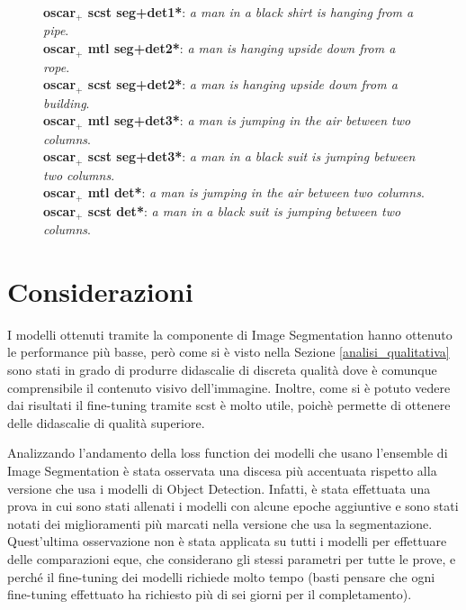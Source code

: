 \begin{figure}[H]
{        \textbf{\acrshort{oscar}$_+$ \acrshort{scst} seg+det1*}: \textit{a man in a black shirt is hanging from a pipe}.\\
        \textbf{\acrshort{oscar}$_+$ \acrshort{mtl} seg+det2*}: \textit{a man is hanging upside down from a rope}.\\
        \textbf{\acrshort{oscar}$_+$ \acrshort{scst} seg+det2*}: \textit{a man is hanging upside down from a building}.\\
        \textbf{\acrshort{oscar}$_+$ \acrshort{mtl} seg+det3*}: \textit{a man is jumping in the air between two columns}.\\
        \textbf{\acrshort{oscar}$_+$ \acrshort{scst} seg+det3*}: \textit{a man in a black suit is jumping between two columns}.\\
        \textbf{\acrshort{oscar}$_+$ \acrshort{mtl} det*}: \textit{a man is jumping in the air between two columns}.\\
        \textbf{\acrshort{oscar}$_+$ \acrshort{scst} det*}: \textit{a man in a black suit is jumping between two columns}.
        }
        \label{fig:test6}
\end{figure}
\newpage

\section{Considerazioni}\label{considerazioni}
I modelli ottenuti tramite la componente di Image Segmentation hanno ottenuto le performance più basse, però come si è visto nella Sezione \ref{analisi_qualitativa} sono stati in grado di produrre didascalie di discreta qualità dove è comunque comprensibile il contenuto visivo dell'immagine. Inoltre, come si è potuto vedere dai risultati il fine-tuning tramite \acrshort{scst} è molto utile, poichè permette di ottenere delle didascalie di qualità superiore. 


Analizzando l'andamento della loss function dei modelli che usano l'ensemble di Image Segmentation è stata osservata una discesa più accentuata rispetto alla versione che usa i modelli di Object Detection. Infatti, è stata effettuata una prova in cui sono stati allenati i modelli con alcune epoche aggiuntive e sono stati notati dei miglioramenti più marcati nella versione che usa la segmentazione. Quest'ultima osservazione non è stata applicata su tutti i modelli per effettuare delle comparazioni eque, che considerano gli stessi parametri per tutte le prove, e perché il fine-tuning dei modelli richiede molto tempo (basti pensare che ogni fine-tuning effettuato ha richiesto più di sei giorni per il completamento).


